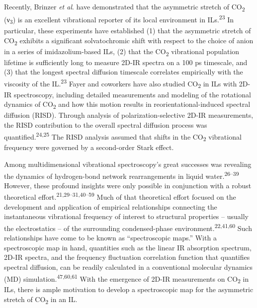 \documentclass[]{article}
\begin{document}
Recently, Brinzer \emph{et al}. have demonstrated that the asymmetric
stretch of CO\textsubscript{2} (ν\textsubscript{3}) is an excellent
vibrational reporter of its local environment in
ILs.\textsuperscript{23} In particular, these experiments have
established (1) that the asymmetric stretch of CO\textsubscript{2}
exhibits a significant solvatochromic shift with respect to the choice
of anion in a series of imidazolium-based ILs, (2) that the
CO\textsubscript{2} vibrational population lifetime is sufficiently long
to measure 2D-IR spectra on a 100 ps timescale, and (3) that the longest
spectral diffusion timescale correlates empirically with the viscosity
of the IL.\textsuperscript{23} Fayer and coworkers have also studied
CO\textsubscript{2} in ILs with 2D-IR spectroscopy, including detailed
measurements and modeling of the rotational dynamics of
CO\textsubscript{2} and how this motion results in
reorientational-induced spectral diffusion (RISD). Through analysis of
polarization-selective 2D-IR measurements, the RISD contribution to the
overall spectral diffusion process was
quantified.\textsuperscript{24,25} The RISD analysis assumed that shifts
in the CO\textsubscript{2} vibrational frequency were governed by a
second-order Stark effect.

Among multidimensional vibrational spectroscopy's great successes was
revealing the dynamics of hydrogen-bond network rearrangements in liquid
water.\textsuperscript{26--39} However, these profound insights were
only possible in conjunction with a robust theoretical
effort.\textsuperscript{21,29--31,40--59} Much of that theoretical
effort focused on the development and application of empirical
relationships connecting the instantaneous vibrational frequency of
interest to structural properties -- usually the electrostatics -- of
the surrounding condensed-phase environment.\textsuperscript{22,41,60}
Such relationships have come to be known as ``spectroscopic maps.'' With
a spectroscopic map in hand, quantities such as the linear IR absorption
spectrum, 2D-IR spectra, and the frequency fluctuation correlation
function that quantifies spectral diffusion, can be readily calculated
in a conventional molecular dynamics (MD)
simulation.\textsuperscript{47,60,61} With the emergence of 2D-IR
measurements on CO\textsubscript{2} in ILs, there is ample motivation to
develop a spectroscopic map for the asymmetric stretch of
CO\textsubscript{2} in an IL.
\end{document}
